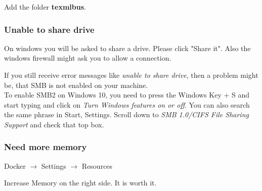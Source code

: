 \documentclass[a4paper]{article}
\begin{document}
Add the folder \textbf{texmlbus}.

\subsubsection{Unable to share drive}
On windows you will be asked to share a drive. Please click "Share it". Also the windows firewall might ask you to allow a connection.

If you still receive error messages like \textsl{unable to share drive}, then a problem might be, that SMB is not enabled on your machine. \\
To enable SMB2 on Windows 10, you need to press the Windows Key + S and start typing and click on \textit{Turn Windows features on or off}. You can also search the same phrase in Start, Settings. Scroll down to \textit{SMB 1.0/CIFS File Sharing Support} and check that top box.

\subsubsection{Need more memory}
Docker $\rightarrow$ Settings $\rightarrow$ Resources 

Increase Memory on the right side. It is worth it.
\end{document}
